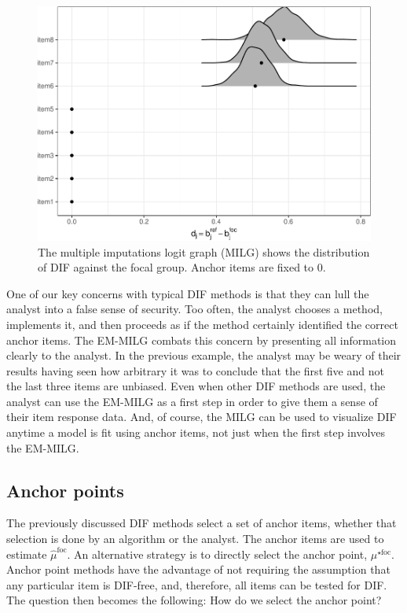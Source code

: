 \documentclass[
  11pt,
]{article}
\begin{document}
\begin{figure}[H]

{\centering \includegraphics[width=0.7\linewidth]{paper_files/figure-latex/milg-1} 

}

\caption{The multiple imputations logit graph (MILG) shows the distribution of DIF against the focal group. Anchor items are fixed to 0.}\label{fig:milg}
\end{figure}

One of our key concerns with typical DIF methods is that they can lull the analyst into a false sense of security. Too often, the analyst chooses a method, implements it, and then proceeds as if the method certainly identified the correct anchor items. The EM-MILG combats this concern by presenting all information clearly to the analyst. In the previous example, the analyst may be weary of their results having seen how arbitrary it was to conclude that the first five and not the last three items are unbiased. Even when other DIF methods are used, the analyst can use the EM-MILG as a first step in order to give them a sense of their item response data. And, of course, the MILG can be used to visualize DIF anytime a model is fit using anchor items, not just when the first step involves the EM-MILG.

\hypertarget{anchor-points}{%
\subsection{Anchor points}\label{anchor-points}}

The previously discussed DIF methods select a set of anchor items, whether that selection is done by an algorithm or the analyst. The anchor items are used to estimate \(\hat \mu^\text{foc}\). An alternative strategy is to directly select the anchor point, \(\mu^{\star\text{foc}}\). Anchor point methods have the advantage of not requiring the assumption that any particular item is DIF-free, and, therefore, all items can be tested for DIF. The question then becomes the following: How do we select the anchor point?
\end{document}
